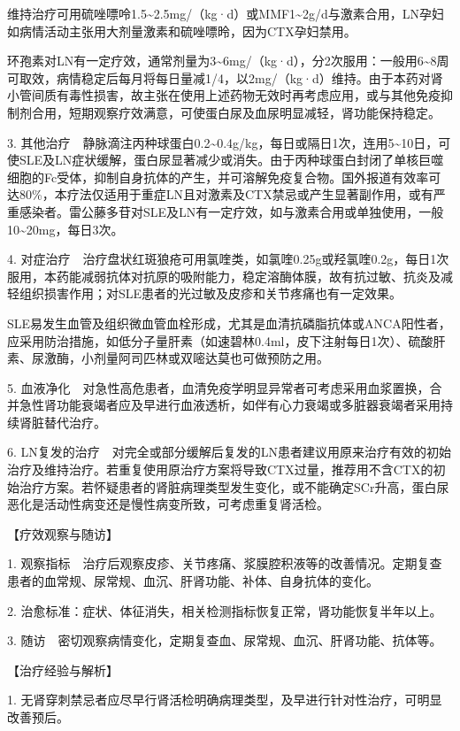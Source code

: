维持治疗可用硫唑嘌呤1.5\textasciitilde{}2.5mg/（kg·d）或MMF1\textasciitilde{}2g/d与激素合用，LN孕妇如病情活动主张用大剂量激素和硫唑嘌昤，因为CTX孕妇禁用。

环孢素对LN有一定疗效，通常剂量为3\textasciitilde{}6mg/（kg·d），分2次服用：一般用6\textasciitilde{}8周可取效，病情稳定后每月将每日量减1/4，以2mg/（kg·d）维持。由于本药对肾小管间质有毒性损害，故主张在使用上述药物无效时再考虑应用，或与其他免疫抑制剂合用，短期观察疗效满意，可使蛋白尿及血尿明显减轻，肾功能保持稳定。

3.
其他治疗　静脉滴注丙种球蛋白0.2\textasciitilde{}0.4g/kg，每日或隔日1次，连用5\textasciitilde{}10日，可使SLE及LN症状缓解，蛋白尿显著减少或消失。由于丙种球蛋白封闭了单核巨噬细胞的Fc受体，抑制自身抗体的产生，并可溶解免疫复合物。国外报道有效率可达80\%，本疗法仅适用于重症LN且对激素及CTX禁忌或产生显著副作用，或有严重感染者。雷公藤多苷对SLE及LN有一定疗效，如与激素合用或单独使用，一般10\textasciitilde{}20mg，每日3次。

4.
对症治疗　治疗盘状红斑狼疮可用氯喹类，如氯喹0.25g或羟氯喹0.2g，每日1次服用，本药能减弱抗体对抗原的吸附能力，稳定溶酶体膜，故有抗过敏、抗炎及减轻组织损害作用；对SLE患者的光过敏及皮疹和关节疼痛也有一定效果。

SLE易发生血管及组织微血管血栓形成，尤其是血清抗磷脂抗体或ANCA阳性者，应采用防治措施，如低分子量肝素（如速碧林0.4ml，皮下注射每日1次）、硫酸肝素、尿激酶，小剂量阿司匹林或双嘧达莫也可做预防之用。

5.
血液净化　对急性高危患者，血清免疫学明显异常者可考虑采用血浆置换，合并急性肾功能衰竭者应及早进行血液透析，如伴有心力衰竭或多脏器衰竭者采用持续肾脏替代治疗。

6.
LN复发的治疗　对完全或部分缓解后复发的LN患者建议用原来治疗有效的初始治疗及维持治疗。若重复使用原治疗方案将导致CTX过量，推荐用不含CTX的初始治疗方案。若怀疑患者的肾脏病理类型发生变化，或不能确定SCr升高，蛋白尿恶化是活动性病变还是慢性病变所致，可考虑重复肾活检。

【疗效观察与随访】

1.
观察指标　治疗后观察皮疹、关节疼痛、浆膜腔积液等的改善情况。定期复查患者的血常规、尿常规、血沉、肝肾功能、补体、自身抗体的变化。

2. 治愈标准：症状、体征消失，相关检测指标恢复正常，肾功能恢复半年以上。

3. 随访　密切观察病情变化，定期复查血、尿常规、血沉、肝肾功能、抗体等。

【治疗经验与解析】

1.
无肾穿刺禁忌者应尽早行肾活检明确病理类型，及早进行针对性治疗，可明显改善预后。


